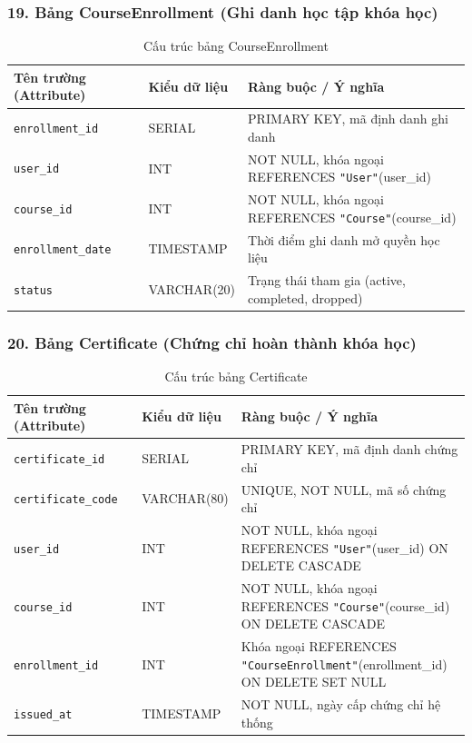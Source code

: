 \documentclass[../DoAn.tex]{subfiles}
\begin{document}
\subsubsection*{19. Bảng CourseEnrollment (Ghi danh học tập khóa học)}
\begin{table}[H]
\centering
\footnotesize
\renewcommand{\arraystretch}{1.2}
\begin{tabular}{|p{4.2cm}|p{3.2cm}|p{7.1cm}|}
\hline
\textbf{Tên trường (Attribute)} & \textbf{Kiểu dữ liệu} & \textbf{Ràng buộc / Ý nghĩa} \\
\hline
\texttt{enrollment\_id} & SERIAL & PRIMARY KEY, mã định danh ghi danh \\
\hline
\texttt{user\_id} & INT & NOT NULL, khóa ngoại REFERENCES \texttt{"User"}(user\_id) \\
\hline
\texttt{course\_id} & INT & NOT NULL, khóa ngoại REFERENCES \texttt{"Course"}(course\_id) \\
\hline
\texttt{enrollment\_date} & TIMESTAMP & Thời điểm ghi danh mở quyền học liệu \\
\hline
\texttt{status} & VARCHAR(20) & Trạng thái tham gia (active, completed, dropped) \\
\hline
\end{tabular}
\caption{Cấu trúc bảng CourseEnrollment}
\label{tab:schema_courseenrollment}
\end{table}

\subsubsection*{20. Bảng Certificate (Chứng chỉ hoàn thành khóa học)}
\begin{table}[H]
\centering
\footnotesize
\renewcommand{\arraystretch}{1.2}
\begin{tabular}{|p{4.2cm}|p{3.2cm}|p{7.1cm}|}
\hline
\textbf{Tên trường (Attribute)} & \textbf{Kiểu dữ liệu} & \textbf{Ràng buộc / Ý nghĩa} \\
\hline
\texttt{certificate\_id} & SERIAL & PRIMARY KEY, mã định danh chứng chỉ \\
\hline
\texttt{certificate\_code} & VARCHAR(80) & UNIQUE, NOT NULL, mã số chứng chỉ \\
\hline
\texttt{user\_id} & INT & NOT NULL, khóa ngoại REFERENCES \texttt{"User"}(user\_id) ON DELETE CASCADE \\
\hline
\texttt{course\_id} & INT & NOT NULL, khóa ngoại REFERENCES \texttt{"Course"}(course\_id) ON DELETE CASCADE \\
\hline
\texttt{enrollment\_id} & INT & Khóa ngoại REFERENCES \texttt{"CourseEnrollment"}(enrollment\_id) ON DELETE SET NULL \\
\hline
\texttt{issued\_at} & TIMESTAMP & NOT NULL, ngày cấp chứng chỉ hệ thống \\
\hline
\end{tabular}
\caption{Cấu trúc bảng Certificate}
\label{tab:schema_certificate}
\end{table}
\end{document}
